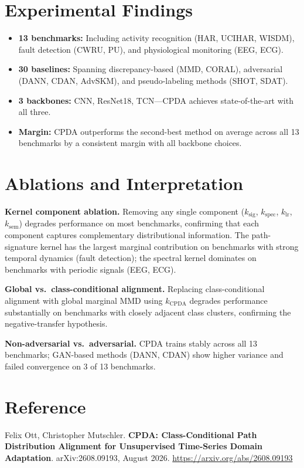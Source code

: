 \documentclass[10pt,twocolumn]{article}
\begin{document}
\section{Experimental Findings}

\begin{itemize}[itemsep=2pt,parsep=0pt]
  \item \textbf{13 benchmarks:} Including activity recognition (HAR, UCIHAR,
    WISDM), fault detection (CWRU, PU), and physiological monitoring (EEG, ECG).
  \item \textbf{30 baselines:} Spanning discrepancy-based (MMD, CORAL),
    adversarial (DANN, CDAN, AdvSKM), and pseudo-labeling methods (SHOT, SDAT).
  \item \textbf{3 backbones:} CNN, ResNet18, TCN---CPDA achieves state-of-the-art
    with all three.
  \item \textbf{Margin:} CPDA outperforms the second-best method on average
    across all 13 benchmarks by a consistent margin with all backbone choices.
\end{itemize}

\section{Ablations and Interpretation}

\textbf{Kernel component ablation.}
Removing any single component ($k_{\mathrm{sig}}$, $k_{\mathrm{spec}}$,
$k_{\mathrm{lr}}$, $k_{\mathrm{sem}}$) degrades performance on most benchmarks,
confirming that each component captures complementary distributional information.
The path-signature kernel has the largest marginal contribution on benchmarks
with strong temporal dynamics (fault detection); the spectral kernel dominates
on benchmarks with periodic signals (EEG, ECG).

\textbf{Global vs.\ class-conditional alignment.}
Replacing class-conditional alignment with global marginal MMD using
$k_{\mathrm{CPDA}}$ degrades performance substantially on benchmarks with
closely adjacent class clusters, confirming the negative-transfer hypothesis.

\textbf{Non-adversarial vs.\ adversarial.}
CPDA trains stably across all 13 benchmarks; GAN-based methods (DANN, CDAN)
show higher variance and failed convergence on 3 of 13 benchmarks.

\section*{Reference}

Felix Ott, Christopher Mutschler.
\textbf{CPDA: Class-Conditional Path Distribution Alignment for
Unsupervised Time-Series Domain Adaptation}.
arXiv:2608.09193, August 2026.
\url{https://arxiv.org/abs/2608.09193}
\end{document}
